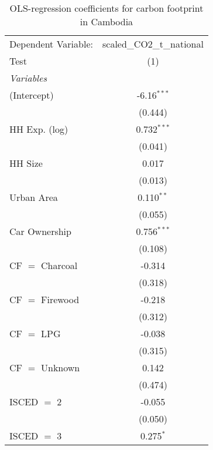 
\begin{table}[htbp!]
   \centering
   \small
   \begin{adjustbox}{width = 1\textwidth, max height = 0.95\textheight, center}
      \begin{threeparttable}[b]
         \caption{\label{tab:OLS_2_KHM} OLS-regression coefficients for carbon footprint in Cambodia}
         \begin{tabular}{lc}
            \tabularnewline \midrule \midrule
            Dependent Variable: & scaled\_CO2\_t\_national\\     
            Test                & (1)\\  
            \midrule
            \emph{Variables}\\
            (Intercept)         & -6.16$^{***}$\\   
                                & (0.444)\\   
            HH Exp. (log)       & 0.732$^{***}$\\   
                                & (0.041)\\   
            HH Size             & 0.017\\   
                                & (0.013)\\   
            Urban Area          & 0.110$^{**}$\\   
                                & (0.055)\\   
            Car Ownership       & 0.756$^{***}$\\   
                                & (0.108)\\   
            CF $=$ Charcoal     & -0.314\\   
                                & (0.318)\\   
            CF $=$ Firewood     & -0.218\\   
                                & (0.312)\\   
            CF $=$ LPG          & -0.038\\   
                                & (0.315)\\   
            CF $=$ Unknown      & 0.142\\   
                                & (0.474)\\   
            ISCED $=$ 2         & -0.055\\   
                                & (0.050)\\   
            ISCED $=$ 3         & 0.275$^{*}$\\   

\end{tabular}
\end{threeparttable}
\end{adjustbox}
\end{table}
